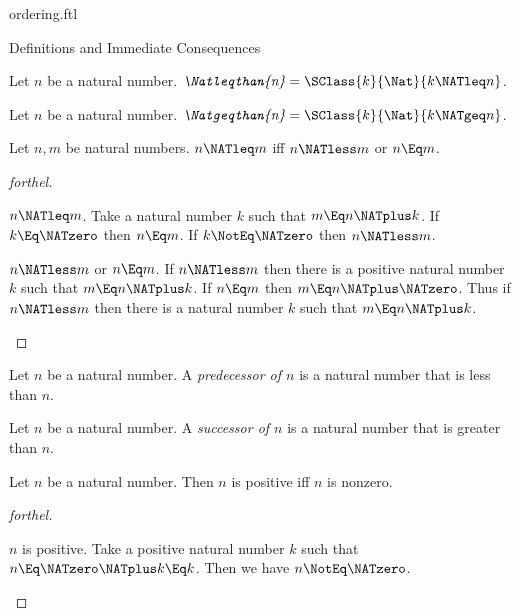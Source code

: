 \documentclass{stex}
\begin{document}
\begin{smodule}{ordering.ftl}
\begin{sfragment}{Definitions and Immediate Consequences}
  \begin{definition}[forthel,for=Natleqthan]
    Let $n$ be a natural number.
    $\emph{\Natleqthan{n}} = \SClass{k}{\Nat}{k \NATleq n}$.
  \end{definition}

  \begin{definition}[forthel,for=Natgeqthan]
    Let $n$ be a natural number.
    $\emph{\Natgeqthan{n}} = \SClass{k}{\Nat}{k \NATgeq n }$.
  \end{definition}

  \begin{proposition}[forthel]
    Let $n, m$ be natural numbers.
    $n \NATleq m$ iff $n \NATless m$ or $n \Eq m$.
  \end{proposition}
  \begin{proof}[forthel]
    \begin{case}{$n \NATleq m$.}
      Take a natural number $k$ such that $m \Eq n \NATplus k$.
      If $k \Eq \NATzero$ then $n \Eq m$. If $k \NotEq \NATzero$ then $n \NATless m$.
    \end{case}

    \begin{case}{$n \NATless m$ or $n \Eq m$.}
      If $n \NATless m$ then there is a positive natural number $k$ such that $m \Eq n \NATplus k$.
      If $n \Eq m$ then $m \Eq n \NATplus \NATzero$.
      Thus if $n \NATless m$ then there is a natural number $k$ such that $m \Eq n \NATplus k$.
    \end{case}
  \end{proof}

  \begin{definition}[forthel,for=predecessor]
    Let $n$ be a natural number.
    A \emph{predecessor of $n$} is a natural number that is less than $n$.
  \end{definition}

  \begin{definition}[forthel,for=successor]
    Let $n$ be a natural number.
    A \emph{successor of $n$} is a natural number that is greater than $n$.
  \end{definition}

  \begin{proposition}[forthel]
    Let $n$ be a natural number.
    Then $n$ is positive iff $n$ is nonzero.
  \end{proposition}
  \begin{proof}[forthel]
    \begin{case}{$n$ is positive.}
      Take a positive natural number $k$ such that $n \Eq \NATzero \NATplus k \Eq k$.
      Then we have $n \NotEq \NATzero$.
    \end{case}


\end{proof}
\end{sfragment}
\end{smodule}
\end{document}

